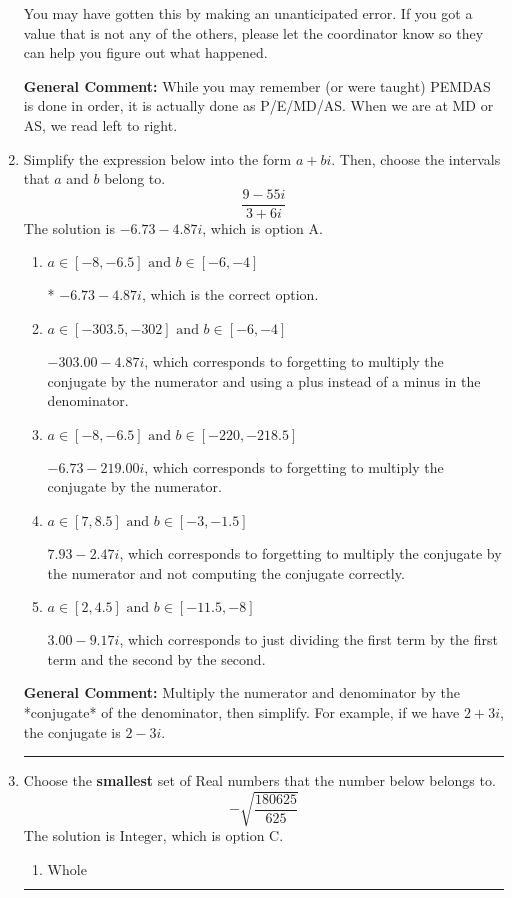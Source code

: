 \documentclass{extbook}[14pt]
\newcommand{\litem}[1]{\item #1

\rule{\textwidth}{0.4pt}}
\begin{document}
\begin{enumerate}
{\begin{enumerate}[label=\Alph*.]
 You may have gotten this by making an unanticipated error. If you got a value that is not any of the others, please let the coordinator know so they can help you figure out what happened.
\end{enumerate}

\textbf{General Comment:} While you may remember (or were taught) PEMDAS is done in order, it is actually done as P/E/MD/AS. When we are at MD or AS, we read left to right.
}
\litem{
Simplify the expression below into the form $a+bi$. Then, choose the intervals that $a$ and $b$ belong to.
\[ \frac{9 - 55 i}{3 + 6 i} \]The solution is \( -6.73  - 4.87 i \), which is option A.\begin{enumerate}[label=\Alph*.]
\item \( a \in [-8, -6.5] \text{ and } b \in [-6, -4] \)

* $-6.73  - 4.87 i$, which is the correct option.
\item \( a \in [-303.5, -302] \text{ and } b \in [-6, -4] \)

 $-303.00  - 4.87 i$, which corresponds to forgetting to multiply the conjugate by the numerator and using a plus instead of a minus in the denominator.
\item \( a \in [-8, -6.5] \text{ and } b \in [-220, -218.5] \)

 $-6.73  - 219.00 i$, which corresponds to forgetting to multiply the conjugate by the numerator.
\item \( a \in [7, 8.5] \text{ and } b \in [-3, -1.5] \)

 $7.93  - 2.47 i$, which corresponds to forgetting to multiply the conjugate by the numerator and not computing the conjugate correctly.
\item \( a \in [2, 4.5] \text{ and } b \in [-11.5, -8] \)

 $3.00  - 9.17 i$, which corresponds to just dividing the first term by the first term and the second by the second.
\end{enumerate}

\textbf{General Comment:} Multiply the numerator and denominator by the *conjugate* of the denominator, then simplify. For example, if we have $2+3i$, the conjugate is $2-3i$.
}
\litem{
Choose the \textbf{smallest} set of Real numbers that the number below belongs to.
\[ -\sqrt{\frac{180625}{625}} \]The solution is \( \text{Integer} \), which is option C.\begin{enumerate}[label=\Alph*.]
\item \( \text{Whole} \)


\end{enumerate}}
\end{enumerate}
\end{document}
